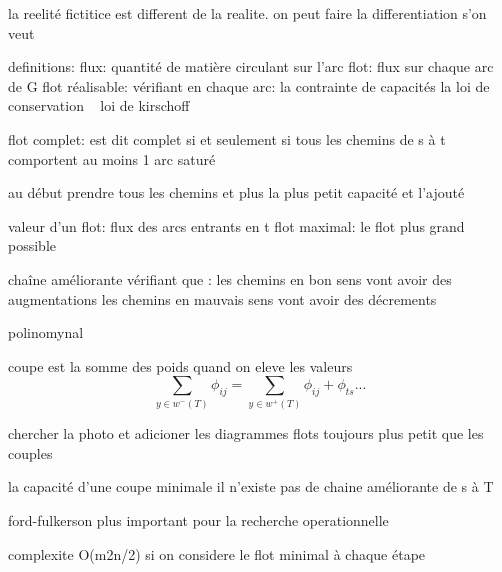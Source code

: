 \documentclass{article}
\begin{document}
la reelité fictitice est different de la realite. on peut faire la differentiation s'on veut

definitions:
flux: quantité de matière circulant sur l'arc
flot: flux sur chaque arc de G
flot réalisable: vérifiant en chaque arc:
    la contrainte de capacités
    la loi de conservation ~ loi de kirschoff

flot complet: est dit complet si et seulement si tous les chemins de s à t comportent au moins 1 arc saturé

au début prendre tous les chemins et plus la plus petit capacité et l'ajouté

valeur d'un flot:
    flux des arcs entrants en t
    flot maximal: le flot plus grand possible

chaîne améliorante
    vérifiant que :
        les chemins en bon sens vont avoir des augmentations
        les chemins en mauvais sens vont avoir des décrements

polinomynal

coupe est la somme des poids quand on eleve les valeurs
\begin{equation}
    \sum_{y \in w^{-}(T)} \phi_{ij} = \sum_{y \in w^{+}(T)} \phi_{ij} + \phi_{ts} ...
\end{equation}

chercher la photo et adicioner les diagrammes
flots toujours plus petit que les couples

la capacité d'une coupe minimale
il n'existe pas de chaine améliorante de s à T

ford-fulkerson plus important pour la recherche operationnelle


complexite O(m2n/2)
    si on considere le flot minimal à chaque étape
    
\end{document}
